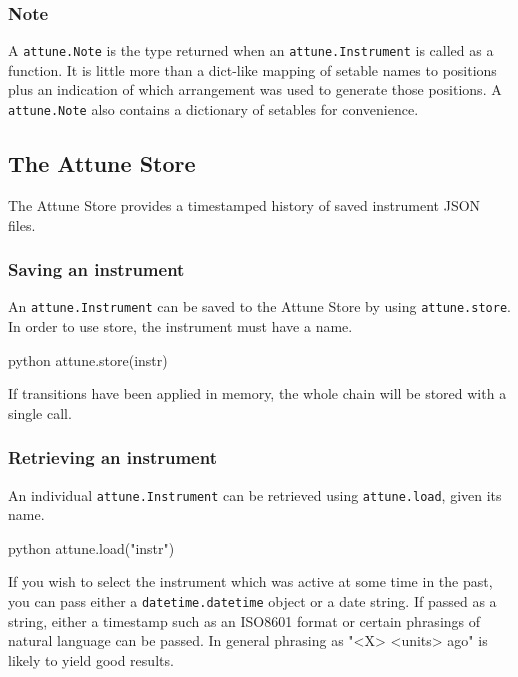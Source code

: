 \hypertarget{note}{%
\subsubsection{Note}\label{note}}

A \texttt{attune.Note} is the type returned when an
\texttt{attune.Instrument} is called as a function. It
is little more than a dict-like mapping of setable names to positions
plus an indication of which arrangement was used to generate those
positions. A \texttt{attune.Note} also contains a
dictionary of setables for convenience.

\hypertarget{store}{%
\subsection{The Attune Store}\label{store}}

The Attune Store provides a timestamped history of saved instrument JSON
files.

\hypertarget{saving-an-instrument}{%
\subsubsection{Saving an instrument}\label{saving-an-instrument}}

An \texttt{attune.Instrument} can be saved to the
Attune Store by using \texttt{attune.store}. In order to use store, the
instrument must have a name.

\begin{codefragment}{python}
attune.store(instr)
\end{codefragment}

If transitions have been applied in memory, the whole chain will be
stored with a single call.

\hypertarget{retrieving-an-instrument}{%
\subsubsection{Retrieving an instrument}\label{retrieving-an-instrument}}

An individual \texttt{attune.Instrument} can be
retrieved using \texttt{attune.load}, given its name.

\begin{codefragment}{python}
attune.load("instr")
\end{codefragment}

If you wish to select the instrument which was active at some time in
the past, you can pass either a
\texttt{datetime.datetime} object or a date string. If
passed as a string, either a timestamp such as an ISO8601 format or
certain phrasings of natural language can be passed. In general phrasing
as "\textless X\textgreater{} \textless units\textgreater{} ago" is
likely to yield good results.

